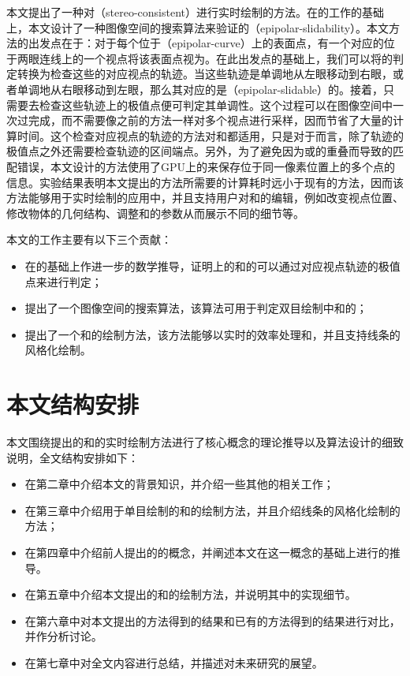 本文提出了一种对\stc{}（stereo-consistent）\con{}进行实时绘制的方法。在\citeauthor{kim2013stereoscopic}的工作的基础上，本文设计了一种图像空间的搜索算法来验证\conp{}的\epsl{}（epipolar-slidability）。本文方法的出发点在于：对于每个位于\ec{}（epipolar-curve）上的表面点，有一个对应的位于两眼连线上的一个视点将该表面点视为\conp{}。在此出发点的基础上，我们可以将\epsl{}的判定转换为检查这些\conp{}的对应视点的轨迹。当这些轨迹是单调地从左眼移动到右眼，或者单调地从右眼移动到左眼，那么其对应的\conp{}是\epslb{}（epipolar-slidable）的。接着，只需要去检查这些轨迹上的极值点便可判定其单调性。这个过程可以在图像空间中一次过完成，而不需要像之前的方法一样对多个视点进行采样，因而节省了大量的计算时间。这个检查对应视点的轨迹的方法对\con{}和\scon{}都适用，只是对于\scon{}而言，除了轨迹的极值点之外还需要检查轨迹的区间端点。另外，为了避免因为\conp{}或\sconp{}的重叠而导致的匹配错误，本文设计的方法使用了GPU上的\ppll{}\cite{yang2010real}来保存位于同一像素位置上的多个点的信息。实验结果表明本文提出的方法所需要的计算耗时远小于现有的方法，因而该方法能够用于实时绘制的应用中，并且支持用户对\stc{}\con{}和\scon{}的编辑，例如改变视点位置、修改物体的几何结构、调整\con{}和\scon{}的参数从而展示不同的细节等。

本文的工作主要有以下三个贡献：

\begin{itemize}
    \item 在\epsl{}的基础上作进一步的数学推导，证明\ec{}上的\conp{}和\sconp{}的\stcy{}可以通过对应视点轨迹的极值点来进行判定；
    \item 提出了一个图像空间的搜索算法，该算法可用于判定双目绘制中\con{}和\scon{}的\epsl{}；
    \item 提出了一个\stc{}\con{}和\scon{}的绘制方法，该方法能够以实时的效率处理\con{}和\scon{}，并且支持线条的风格化绘制。
\end{itemize}

\section{本文结构安排}

本文围绕提出的\stc{}\con{}和\scon{}的实时绘制方法进行了核心概念的理论推导以及算法设计的细致说明，全文结构安排如下：

\begin{itemize}
    \item 在第二章中介绍本文的背景知识，并介绍一些其他的相关工作；
    \item 在第三章中介绍用于单目绘制的\con{}和\scon{}的绘制方法，并且介绍线条的风格化绘制的方法；
    \item 在第四章中介绍前人提出的\epsl{}的概念，并阐述本文在\epsl{}这一概念的基础上进行的推导。
    \item 在第五章中介绍本文提出的\stc{}\con{}和\scon{}的绘制方法，并说明其中的实现细节。
    \item 在第六章中对本文提出的方法得到的结果和已有的方法得到的结果进行对比，并作分析讨论。
    \item 在第七章中对全文内容进行总结，并描述对未来研究的展望。
\end{itemize}